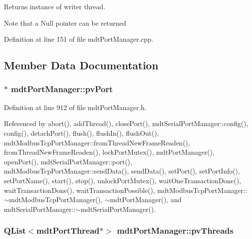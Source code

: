 Returns instance of writer thread. 

Note that a Null pointer can be returned 

Definition at line 151 of file mdt\-Port\-Manager.\-cpp.



\subsection{Member Data Documentation}
\hypertarget{classmdt_port_manager_af856162aab4f1c5202c1dfb330fae538}{
\subsubsection[{pv\-Port}]{$\ast$ mdt\-Port\-Manager\-::pv\-Port\hspace{0.3cm}{\ttfamily [protected]}}}\label{classmdt_port_manager_af856162aab4f1c5202c1dfb330fae538}


Definition at line 912 of file mdt\-Port\-Manager.\-h.



Referenced by abort(), add\-Thread(), close\-Port(), mdt\-Serial\-Port\-Manager\-::config(), config(), detach\-Port(), flush(), flush\-In(), flush\-Out(), mdt\-Modbus\-Tcp\-Port\-Manager\-::from\-Thread\-New\-Frame\-Readen(), from\-Thread\-New\-Frame\-Readen(), lock\-Port\-Mutex(), mdt\-Port\-Manager(), open\-Port(), mdt\-Serial\-Port\-Manager\-::port(), mdt\-Modbus\-Tcp\-Port\-Manager\-::send\-Data(), send\-Data(), set\-Port(), set\-Port\-Info(), set\-Port\-Name(), start(), stop(), unlock\-Port\-Mutex(), wait\-One\-Transaction\-Done(), wait\-Transaction\-Done(), wait\-Transaction\-Possible(), mdt\-Modbus\-Tcp\-Port\-Manager\-::$\sim$mdt\-Modbus\-Tcp\-Port\-Manager(), $\sim$mdt\-Port\-Manager(), and mdt\-Serial\-Port\-Manager\-::$\sim$mdt\-Serial\-Port\-Manager().

\hypertarget{classmdt_port_manager_a8e0d49b789f8b01d469e84b487799573}{
\subsubsection[{pv\-Threads}]{\setlength{\rightskip}{0pt plus 5cm}Q\-List$<${\bf mdt\-Port\-Thread}$\ast$$>$ mdt\-Port\-Manager\-::pv\-Threads\hspace{0.3cm}{\ttfamily [protected]}}}\label{classmdt_port_manager_a8e0d49b789f8b01d469e84b487799573}


